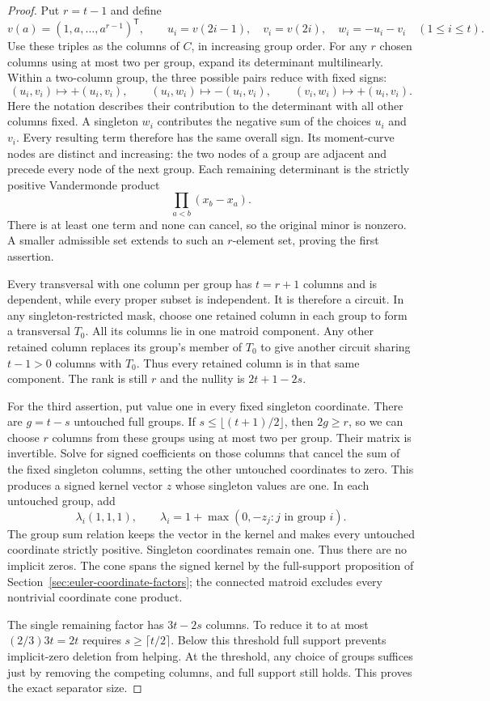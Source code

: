 \begin{proof}
Put $r=t-1$ and define
\[
 v(a)=(1,a,\ldots,a^{r-1})^{\mathsf T},\qquad
 u_i=v(2i-1),\quad v_i=v(2i),\quad w_i=-u_i-v_i
 \quad(1\le i\le t).
\]
Use these triples as the columns of $C$, in increasing group order.
For any $r$ chosen columns using at most two per group, expand its determinant
multilinearly.  Within a two-column group, the three possible pairs reduce
with fixed signs:
\[
 (u_i,v_i)\mapsto +(u_i,v_i),\qquad
 (u_i,w_i)\mapsto -(u_i,v_i),\qquad
 (v_i,w_i)\mapsto +(u_i,v_i).
\]
Here the notation describes their contribution to the determinant with all
other columns fixed.  A singleton $w_i$ contributes the negative sum of the
choices $u_i$ and $v_i$.  Every resulting term therefore has the same overall
sign.  Its moment-curve nodes are distinct and increasing: the two nodes
of a group are adjacent and precede every node of the next group.  Each
remaining determinant is the strictly positive Vandermonde product
\[
                      \prod_{a<b}(x_b-x_a).
\]
There is at least one term and none can cancel, so the original minor is
nonzero.  A smaller admissible set extends to such an $r$-element set, proving
the first assertion.

Every transversal with one column per group has $t=r+1$ columns and is
dependent, while every proper subset is independent.  It is therefore a
circuit.  In any singleton-restricted mask, choose one retained column in
each group to form a transversal $T_0$.  All its columns lie in one matroid
component.  Any other retained column replaces its group's member of $T_0$
to give another circuit sharing $t-1>0$ columns with $T_0$.  Thus every
retained column is in that same component.  The rank is still $r$ and the
nullity is $2t+1-2s$.

For the third assertion, put value one in every fixed singleton coordinate.
There are $g=t-s$ untouched full groups.  If
$s\le\lfloor(t+1)/2\rfloor$, then $2g\ge r$, so we can choose $r$ columns
from these groups using at most two per group.  Their matrix is invertible.
Solve for signed coefficients on those columns that cancel the sum of the
fixed singleton columns, setting the other untouched coordinates to zero.
This produces a signed kernel vector $z$ whose singleton values are one.
In each untouched group, add
\[
              \lambda_i(1,1,1),\qquad
              \lambda_i=1+\max(0,-z_j:j\text{ in group }i).
\]
The group sum relation keeps the vector in the kernel and makes every
untouched coordinate strictly positive.  Singleton coordinates remain one.
Thus there are no implicit zeros.  The cone spans the signed kernel by the
full-support proposition of Section~\ref{sec:euler-coordinate-factors};
the connected matroid excludes every nontrivial coordinate cone product.

The single remaining factor has $3t-2s$ columns.  To reduce it to at most
$(2/3)3t=2t$ requires $s\ge\lceil t/2\rceil$.  Below this threshold full
support prevents implicit-zero deletion from helping.  At the threshold,
any choice of groups suffices just by removing the competing columns, and
full support still holds.  This proves the exact separator size.
\end{proof}

